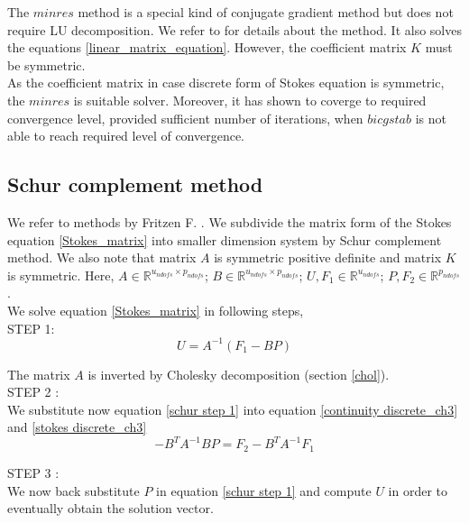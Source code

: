 \documentclass[a4paper,twoside,openright]{book}
\begin{document}
The $minres$ method is a special kind of conjugate gradient method but does not require LU decomposition. We refer to \cite{minres} for details about the method. It also solves the equations \ref{linear_matrix_equation}. However, the coefficient matrix $K$ must be symmetric. \\

As the coefficient matrix in case discrete form of Stokes equation is symmetric, the $minres$ is suitable solver. Moreover, it has shown to coverge to required convergence level, provided sufficient number of iterations, when $bicgstab$ is not able to reach required level of convergence.

\subsection{Schur complement method} \label{schur}

We refer to methods by Fritzen F. \cite{Fritzen}. We subdivide the matrix form of the Stokes equation \eqref{Stokes_matrix} into smaller dimension system by Schur complement method. We also note that matrix $A$ is symmetric positive definite and matrix $K$ is symmetric.
Here, $A \in \mathbb{R}^{u_{ndofs} \times p_{ndofs}}$; $B \in \mathbb{R}^{u_{ndofs} \times p_{ndofs}}$; $U,F_1 \in \mathbb{R}^{u_{ndofs}}$; $P, F_2 \in \mathbb{R}^{p_{ndofs}}$. \\

We solve equation \eqref{Stokes_matrix} in following steps,\\

STEP 1: \\ 
\begin{equation}\label{schur step 1}
U = A^{-1}(F_1 - BP) 
\end{equation}

The matrix $A$ is inverted by Cholesky decomposition (section \ref{chol}). \\

STEP 2 : \\
We substitute now equation \eqref{schur step 1} into equation \eqref{continuity discrete_ch3} and \eqref{stokes discrete_ch3}
\begin{equation}\label{schur step 2}
- B^T A^{-1} B P = F_2 - B^T A^{-1} F_1
\end{equation}

STEP 3 : \\
We now back substitute $P$ in equation \eqref{schur step 1} and compute $U$ in order to eventually obtain the solution vector.
\\
\end{document}
